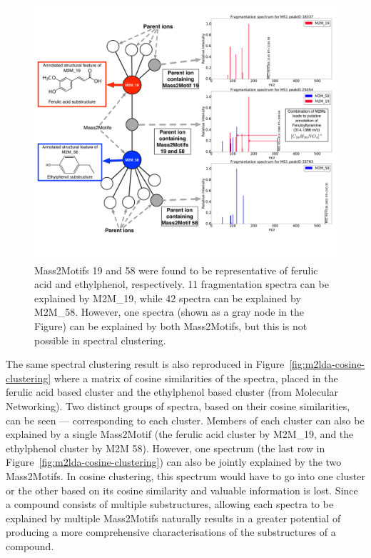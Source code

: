 \begin{figure}[!htbp]
\centering\includegraphics[width=1.0\linewidth]{07-lda/figures/combinedm2m.pdf}
\centering\caption{Mass2Motifs 19 and 58 were found to be representative of ferulic acid and ethylphenol, respectively. 11 fragmentation spectra can be explained by M2M_19, while 42 spectra can be explained by M2M_58. However, one spectra (shown as a gray node in the Figure) can be explained by both Mass2Motifs, but this is not possible in spectral clustering.\label{fig:m2lda-combined-m2m}}
\end{figure}

The same spectral clustering result is also reproduced in Figure~\ref{fig:m2lda-cosine-clustering} where a matrix of cosine similarities of the spectra, placed in the ferulic acid based cluster and the ethylphenol based cluster (from Molecular Networking). Two distinct groups of spectra, based on their cosine similarities, can be seen --- corresponding to each cluster. Members of each cluster can also be explained by a single Mass2Motif (the ferulic acid cluster by M2M_19, and the ethylphenol cluster by M2M 58). However, one spectrum (the last row in Figure~\ref{fig:m2lda-cosine-clustering}) can also be jointly explained by the two Mass2Motifs. In cosine clustering, this spectrum would have to go into one cluster or the other based on its cosine similarity and valuable information is lost. Since a compound consists of multiple substructures, allowing each spectra to be explained by multiple Mass2Motifs naturally results in a greater potential of producing a more comprehensive characterisations of the substructures of a compound. 

